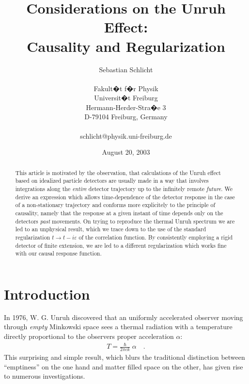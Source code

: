 \documentclass[a4paper,12pt]{article}
\newcommand{\eps}{\varepsilon}
\begin{document}
\title{Considerations on the Unruh Effect:\\ Causality and Regularization}


\author{Sebastian Schlicht    \\
   \mbox{}                                     \\
\normalsize{Fakult�t f�r Physik}           \\
\normalsize{Universit�t Freiburg}            \\
\normalsize{Hermann-Herder-Stra�e 3}          \\
\normalsize{D-79104 Freiburg, Germany}         \\
   \mbox{}                                     \\
{\small schlicht@physik.uni-freiburg.de}        \\
}

\date{August 20, 2003}

\maketitle


\begin{abstract}
\noindent
This article is motivated by the observation, that calculations of the Unruh effect
based on idealized particle detectors are usually made in a way that 
involves integrations along the {\em entire} detector trajectory up to the infinitely 
remote {\em future}.
We derive an expression which allows time-dependence of the detector response
in the case of a non-stationary trajectory
and conforms more explicitely to the principle of causality, namely that the response
at a given instant of time depends only on the detectors {\em past} movements.
On trying to reproduce the thermal Unruh spectrum we are led to an unphysical result,
which we trace down to the use of the standard regularization $t\to t-i\eps$ of the
correlation function. 
By consistently employing a rigid detector of finite extension, we are led to a different
regularization which works fine with our causal response function.
\end{abstract}



\section{Introduction}


In 1976, W. G. Unruh \cite{unr} discovered that an uniformly accelerated observer moving 
through {\em empty} Minkowski space sees a thermal radiation with a temperature directly 
proportional to the observers proper acceleration $\alpha$:
\begin{eqnarray*}
T=\frac{\hbar}{2\pi ck}\;\alpha\quad.
\end{eqnarray*}
This surprising and simple result, which blurs the traditional distinction between 
``emptiness'' on the one hand and matter filled space on the other, has given rise to
numerous investigations.
\end{document}
